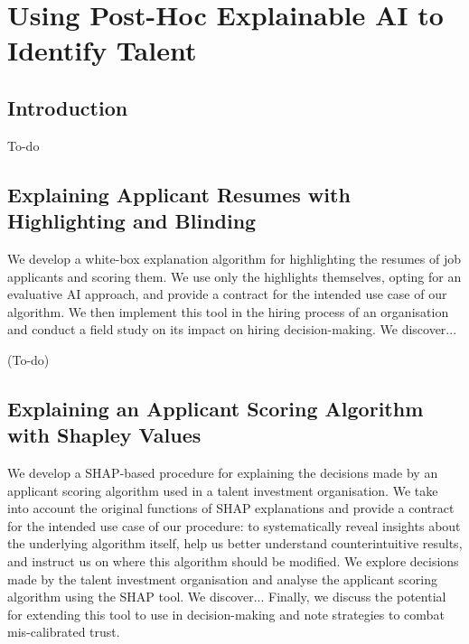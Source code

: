 

\chapter{\label{ch:4-xaicasestudy}Using Post-Hoc Explainable AI to Identify Talent}

\minitoc

\section{Introduction}
To-do

\section{Explaining Applicant Resumes with Highlighting and Blinding}
We develop a white-box explanation algorithm for highlighting the resumes of job applicants and scoring them. We use only the highlights themselves, opting for an evaluative AI approach, and provide a contract for the intended use case of our algorithm. We then implement this tool in the hiring process of an organisation and conduct a field study on its impact on hiring decision-making. We discover...

(To-do)

\section{Explaining an Applicant Scoring Algorithm with Shapley Values}
We develop a SHAP-based procedure for explaining the decisions made by an applicant scoring algorithm used in a talent investment organisation. We take into account the original functions of SHAP explanations and provide a contract for the intended use case of our procedure: to systematically reveal insights about the underlying algorithm itself, help us better understand counterintuitive results, and instruct us on where this algorithm should be modified. We explore decisions made by the talent investment organisation and analyse the applicant scoring algorithm using the SHAP tool. We discover... Finally, we discuss the potential for extending this tool to use in decision-making and note strategies to combat mis-calibrated trust.

